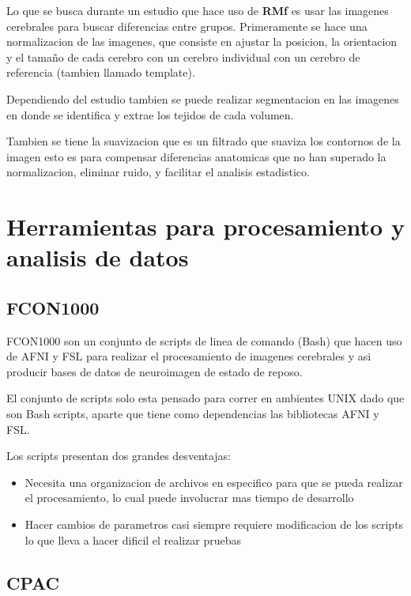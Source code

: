 \documentclass{article}
\begin{document}
Lo que se busca durante un estudio que hace uso de \textbf{RMf} es usar las imagenes cerebrales para buscar diferencias entre grupos. Primeramente  se hace una normalizacion de las imagenes, que consiste en ajustar la posicion, la orientacion y el tamaño de cada cerebro con un cerebro individual con un cerebro de referencia (tambien llamado template).

Dependiendo del estudio tambien se puede realizar segmentacion en las imagenes en donde se identifica y extrae los tejidos de cada volumen.

Tambien se tiene la suavizacion que es un filtrado que suaviza los contornos de la imagen esto es para compensar diferencias anatomicas que no han superado la normalizacion, eliminar ruido, y facilitar el analisis estadistico.

\section{Herramientas para procesamiento y analisis de datos}

\subsection{FCON1000}

FCON1000 son un conjunto de scripts de linea de comando (Bash) que hacen uso de AFNI y FSL para realizar el procesamiento de imagenes cerebrales y asi producir bases de datos de neuroimagen de estado de reposo.

El conjunto de scripts solo esta pensado para correr en ambientes UNIX dado que son Bash scripts, aparte que tiene como dependencias las bibliotecas AFNI y FSL.

Los scripts presentan dos grandes desventajas:

\begin{itemize}
\item{Necesita una organizacion de archivos en especifico para que se pueda realizar el procesamiento, lo cual puede involucrar mas tiempo de desarrollo}
  \item{Hacer cambios de parametros casi siempre requiere modificacion de los scripts lo que lleva a hacer dificil el realizar pruebas}
\end{itemize}

\subsection{CPAC}
\end{document}
